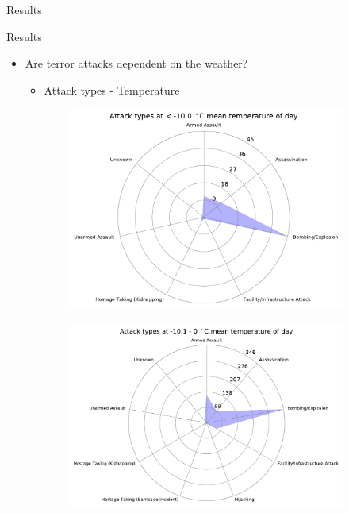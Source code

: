 \documentclass{beamer}
\begin{document}
\begin{frame}{Results}
\end{frame}

\begin{frame}{Results}
	\begin{itemize}
		\item 
		Are terror attacks dependent on the weather?
		\begin{itemize}
			\item Attack types - Temperature
		\end{itemize}
	\end{itemize}
	
	\begin{figure}

		\begin{subfigure}[b]{0.3\textwidth}
			\includegraphics[width=\textwidth]{Temp-Attack/temp<-100_starDiagram}
		\end{subfigure}
		\begin{subfigure}[b]{0.3\textwidth}
			\includegraphics[width=\textwidth]{Temp-Attack/temp-101-0_starDiagram}

\end{subfigure}
\end{figure}
\end{frame}
\end{document}
